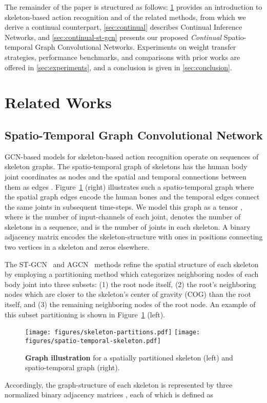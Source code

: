 \documentclass[journal]{IEEEtran}
\theoremstyle{definition}
\begin{document}
The remainder of the paper is structured as follows: \cref{sec:related-work} provides an introduction to skeleton-based action recognition and of the related methods, from which we derive a continual counterpart, \cref{sec:continual} describes Continual Inference Networks, and \cref{sec:continual-st-gcn} presents our proposed \textit{Continual} Spatio-temporal Graph Convolutional Networks. Experiments on weight transfer strategies, performance benchmarks, and comparisons with prior works are offered in \cref{sec:experiments}, and a conclusion is given in \cref{sec:conclusion}.




\section{Related Works} \label{sec:related-work}
\subsection{Spatio-Temporal Graph Convolutional Network}\label{sec:gcn}
GCN-based models for skeleton-based action recognition \cite{yan2018spatial,heidari2021progressive,negarTAGCN} operate on sequences of skeleton graphs. 
The spatio-temporal graph of skeletons  has the human body joint coordinates as nodes  and the spatial and temporal connections between them as edges . 
Figure~\ref{fig:ST-Graph-Partitioning} (right) illustrates such a spatio-temporal graph where the spatial graph edges encode the human bones and the temporal edges connect the same joints in subsequent time-steps.
We model this graph as a tensor , where  is the number of input-channels of each joint,  denotes the number of skeletons in a sequence, and  is the number of joints in each skeleton. A binary adjacency matrix  encodes the skeleton-structure with ones in positions connecting two vertices in a skeleton and zeros elsewhere.

The ST-GCN~\cite{yan2018spatial} and AGCN~\cite{shi2019two} methods refine the spatial structure of each skeleton by employing a partitioning method which categorizes neighboring nodes of each body joint into three subsets: (1) the root node itself, 
(2) the root's neighboring nodes which are closer to the skeleton's center of gravity (COG) than the root itself, and (3) the remaining neighboring nodes of the root node. An example of this subset partitioning is shown in Figure~\ref{fig:ST-Graph-Partitioning} (left). 
\begin{figure}[tb]
    \centering
    \texttt{[image: figures/skeleton-partitions.pdf]}
    \texttt{[image: figures/spatio-temporal-skeleton.pdf]}
    \caption{\textbf{Graph illustration} for a spatially partitioned skeleton (left) and spatio-temporal graph (right).}
    \label{fig:ST-Graph-Partitioning}
\end{figure}
Accordingly, the graph-structure of each skeleton is represented by three normalized binary adjacency matrices , each of which is defined as
\end{document}
